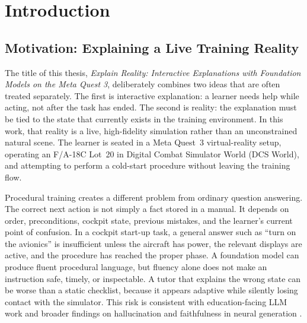 %
\chapter{Introduction}\label{ch:introduction}

\section{Motivation: Explaining a Live Training Reality}\label{sec:intro-motivation}

The title of this thesis, \emph{Explain Reality: Interactive Explanations with
Foundation Models on the Meta Quest 3}, deliberately combines two ideas that
are often treated separately. The first is interactive explanation: a learner
needs help while acting, not after the task has ended. The second is reality:
the explanation must be tied to the state that currently exists in the
training environment. In this work, that reality is a live, high-fidelity
simulation rather than an unconstrained natural scene. The learner is seated in
a Meta Quest~3 virtual-reality setup, operating an F/A-18C Lot~20 in Digital
Combat Simulator World (DCS World), and attempting to perform a cold-start
procedure without leaving the training flow.

Procedural training creates a different problem from ordinary question
answering. The correct next action is not simply a fact stored in a manual. It
depends on order, preconditions, cockpit state, previous mistakes, and the
learner's current point of confusion. In a cockpit start-up task, a general
answer such as ``turn on the avionics'' is insufficient unless the aircraft has
power, the relevant displays are active, and the procedure has reached the
proper phase. A foundation model can produce fluent procedural language, but
fluency alone does not make an instruction safe, timely, or inspectable. A
tutor that explains the wrong state can be worse than a static checklist,
because it appears adaptive while silently losing contact with the simulator.
This risk is consistent with education-facing LLM work and broader findings on
hallucination and faithfulness in neural generation
\citep{kasneci2023chatgpt,ji2023hallucination,maynez2020faithfulness}.

